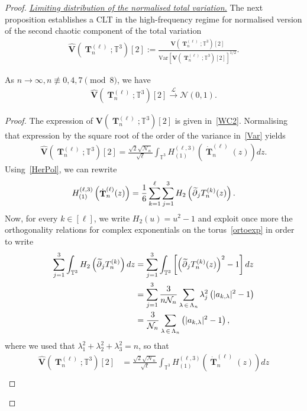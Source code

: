 \documentclass[10pt]{amsart}
\theoremstyle{definition}\newtheorem{defi}[theo]{Definition}\newtheorem{rema}[theo]{Remark}\newtheorem{exam}[theo]{Example}\newtheorem{exem}[theo]{Example}\newtheorem{nota}[theo]{Notation}
\DeclareMathOperator{\bT}{\mathbf{T}}
\newcommand{\scN}{\mathscr{N}}
\newcommand{\bfv}{\mathbf{V}}
\newcommand{\T}{\mathbb{T}^3}
\newcommand{\V}[1]{\mathrm{Var}{\left[#1\right]}}
\newcommand{\Law}{\xrightarrow[]{\mathcal{L}} }
\newcommand{\notcon}[3]{ {#1} \not\equiv {#2} \pmod {#3} }
\newcommand{\Nn}{\mathcal{N}_n}
\let\oldtilde\tilde
\renewcommand*{\tilde}[1]{\mathchoice{\widetilde{#1}}{\widetilde{#1}}{\oldtilde{#1}}{\oldtilde{#1}}}
\begin{document}
\begin{proof}
\medskip
\noindent\underline{\emph{Limiting distribution of the normalised total variation.}} The next proposition establishes a CLT in the high-frequency regime for normalised version of the second chaotic component of the total variation
\begin{gather}\label{nor2}
\widehat{\bfv}\left(\bT_n^{(\ell)};\T\right)[2]:=\frac{\bfv\left(\bT_n^{(\ell)};\T\right)[2]}{\V{\bfv\left(\bT_n^{(\ell)};\T\right)[2]}^{1/2}}.
\end{gather}

\begin{prop}\label{Lim2}
As $n\to \infty, \notcon{n}{0,4,7}{8}$, we have
\begin{gather*}
\widehat{\bfv}\left(\bT_n^{(\ell)};\T\right)[2] \Law \scN(0,1).
\end{gather*}
\end{prop}
\begin{proof}
The expression of $\bfv(\bT_n^{(\ell)};\T)[2]$ is given in~\eqref{WC2}. Normalising that expression by the square root of the order of the variance in~\eqref{Var} yields
\begin{gather*}
\widehat{\bfv}\left(\bT_n^{(\ell)};\T\right)[2] = \frac{\sqrt{2}\sqrt{\Nn}}{\sqrt{\ell}} \int_{\T} H_{(1)}^{(\ell,3)}\left(\dot{\bT}_n^{(\ell)}(z)\right) dz.
\end{gather*}
Using~\eqref{HerPol}, we can rewrite
\begin{gather*}
H_{(1)}^{(\ell,3)}\left(\dot{\bT}_n^{(\ell)}(z)\right) = \frac{1}{6}\sum_{k=1}^{\ell} \sum_{j=1}^{3} H_2\left(\tilde{\partial}_jT_n^{(k)}(z)\right).
\end{gather*}
Now, for every $k\in [\ell]$, we write $H_2(u)=u^2-1$ and exploit once more the orthogonality relations for complex exponentials on the torus~\eqref{ortoexp} in order to write
\begin{align*}
\sum_{j=1}^3\int_{\T} H_2\left(\tilde{\partial}_jT_n^{(k)}\right) dz &=\sum_{j=1}^3\int_{\T}\left[\left(\tilde{\partial}_jT_n^{(k)}(z)\right)^2 -1\right] dz \\
&=\sum_{j=1}^3\frac{3}{n\Nn} \sum_{\lambda\,\in\,\Lambda_n} \lambda_j^2\left(|a_{k,\lambda}|^2-1\right)\\
&= \frac{3}{\Nn}\sum_{\lambda\,\in \,\Lambda_n}\left(|a_{k,\lambda}|^2-1\right),
\end{align*}
where we used that $\lambda_1^2+\lambda_2^2+\lambda_3^2=n$, so that
\begin{equation}\label{tildaV2}
\begin{split}
\widehat{\bfv}\left(\bT_n^{(\ell)};\T\right)[2] &= \frac{\sqrt{2}\sqrt{\Nn}}{\sqrt{\ell}} \int_{\T} H_{(1)}^{(\ell,3)}\left(\dot{\bT}_n^{(\ell)}(z)\right) dz\\

\end{split}
\end{equation}
\end{proof}
\end{proof}
\end{document}
